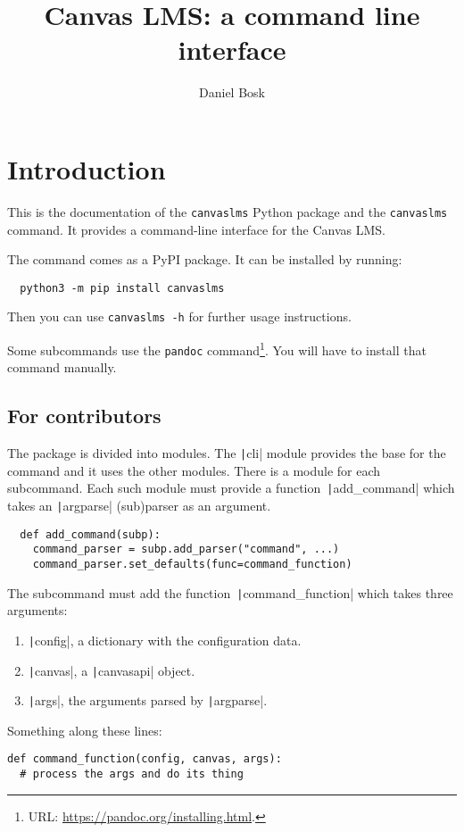\documentclass[a4paper,oneside]{memoir}
\title{%
  Canvas LMS: a command line interface
}
\author{%
  Daniel Bosk
}
\affil{%
  KTH EECS
}
\begin{document}
\frontmatter
\maketitle

\vspace*{\fill}

\clearpage

\clearpage


\tableofcontents
\clearpage

\mainmatter


\chapter{Introduction}

This is the documentation of the \texttt{canvaslms} Python package and the 
\texttt{canvaslms} command.
It provides a command-line interface for the Canvas LMS\@.

The command comes as a PyPI package.
It can be installed by running:
\begin{verbatim}
  python3 -m pip install canvaslms
\end{verbatim}
Then you can use \texttt{canvaslms -h} for further usage instructions.

Some subcommands use the \texttt{pandoc} command\footnote{%
  URL: \url{https://pandoc.org/installing.html}.
}.
You will have to install that command manually.


\section{For contributors}

The package is divided into modules.
The \texttt|cli| module provides the base for the command and it uses the 
other modules.
There is a module for each subcommand.
Each such module must provide a function~\texttt|add_command| which takes 
an \texttt|argparse| (sub)parser as an argument.
\begin{verbatim}
  def add_command(subp):
    command_parser = subp.add_parser("command", ...)
    command_parser.set_defaults(func=command_function)
\end{verbatim}
The subcommand must add the function~\texttt|command_function| which 
takes three arguments:
\begin{enumerate}
  \item \texttt|config|, a dictionary with the configuration data.
  \item \texttt|canvas|, a \texttt|canvasapi| object.
  \item \texttt|args|, the arguments parsed by 
    \texttt|argparse|.
\end{enumerate}
Something along these lines:
\begin{verbatim}
def command_function(config, canvas, args):
  # process the args and do its thing
\end{verbatim}
\end{document}
